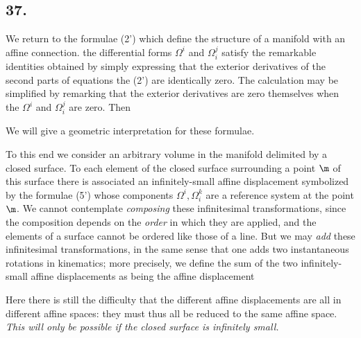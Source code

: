 \subsection*{37.}

\nc{\overOmega}{\overline{\Omega}}

We return to the formulae (2')
which define the structure of a manifold with an affine connection. the differential forms $\Omega^i$ and $\Omega_i^j$ satisfy the remarkable identities obtained by simply expressing that the exterior derivatives of the second parts of equations the (2') are identically zero. The calculation may be simplified by remarking that the exterior derivatives are zero themselves when the $\Omega^i$ and $\Omega_i^j$ are zero. Then

We will give a geometric interpretation for these formulae.

To this end we consider an arbitrary volume in the manifold delimited by a closed surface. To each element of the closed surface surrounding a point $\m$ of this surface there is associated an infinitely-small affine displacement symbolized by the formulae (5')
whose components $\Omega^i, \Omega_i^k$ are  a reference system at the point $\m$. We cannot contemplate \textit{composing} these infinitesimal transformations, since the composition depends on the \textit{order} in which they are applied, and the elements of a surface cannot be ordered like those of a line. But we may \textit{add} these infinitesimal transformations, in the same sense that one adds two instantaneous rotations in kinematics; more precisely, we define the sum of the two infinitely-small affine displacements
as being the affine displacement

Here there is still the difficulty that the different affine displacements are all in different affine spaces: they must thus all be reduced to the same affine space. \textit{This will only be possible if the closed surface is infinitely small.}


